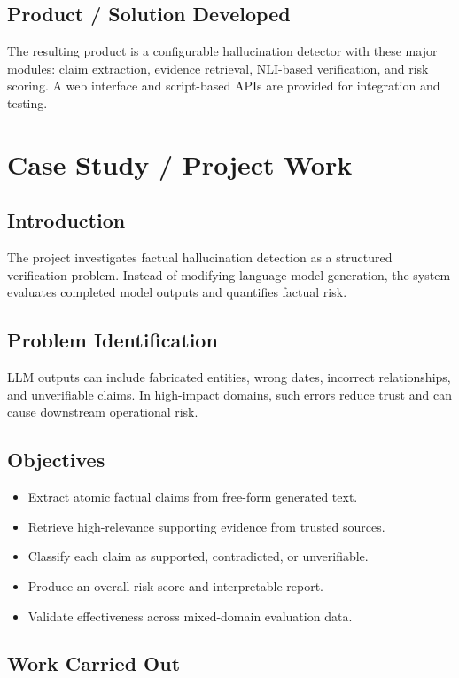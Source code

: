 \documentclass[12pt,a4paper]{report}
\begin{document}
\section{Product / Solution Developed}
The resulting product is a configurable hallucination detector with these major modules:
claim extraction, evidence retrieval, NLI-based verification, and risk scoring.
A web interface and script-based APIs are provided for integration and testing.

\chapter{Case Study / Project Work}
\section{Introduction}
The project investigates factual hallucination detection as a structured verification problem.
Instead of modifying language model generation, the system evaluates completed model outputs
and quantifies factual risk.

\section{Problem Identification}
LLM outputs can include fabricated entities, wrong dates, incorrect relationships,
and unverifiable claims. In high-impact domains, such errors reduce trust and can
cause downstream operational risk.

\section{Objectives}
\begin{itemize}[leftmargin=1.5em]
\item Extract atomic factual claims from free-form generated text.
\item Retrieve high-relevance supporting evidence from trusted sources.
\item Classify each claim as supported, contradicted, or unverifiable.
\item Produce an overall risk score and interpretable report.
\item Validate effectiveness across mixed-domain evaluation data.
\end{itemize}

\section{Work Carried Out}
\end{document}
